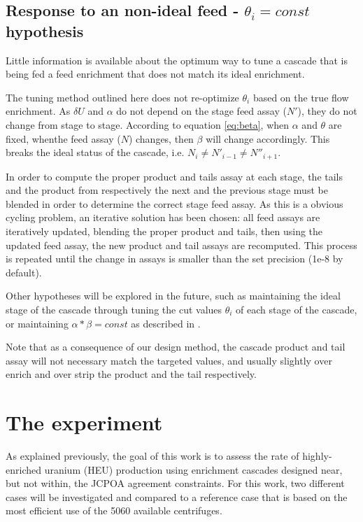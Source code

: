 \documentclass{anstrans}
\begin{document}
\subsection{Response to an non-ideal feed - $\theta_{i} = const$ hypothesis}

Little information is available about the optimum way to tune a cascade that is
being fed a feed enrichment that does not match its ideal enrichment.

The tuning method outlined here does not re-optimize $\theta_i$ based on the
true flow enrichment. As $\delta U$ and $\alpha$ do not depend on the stage feed
assay ($N'$), they do not change from stage to
stage. According to equation \eqref{eq:beta}, when $\alpha$ and $\theta$ are
fixed, whenthe feed assay ($N$) changes, then $\beta$ will change accordingly.
This breaks the ideal status of the cascade, i.e.  $N_{i} \neq N'_{i-1} \neq
N''_{i+1}$.

In order to compute the proper product and tails assay at each stage, the
tails and the product from respectively the next and the previous stage must be
blended in order to determine the correct stage feed assay. As this is a obvious
cycling problem, an iterative solution has been chosen: all feed assays are
iteratively updated, blending the proper product and tails, then using the
updated feed assay, the new product and tail assays are recomputed. This process
is repeated until the change in assays is smaller than the set precision (1e-8
by default).

Other hypotheses will be explored in the future, such as maintaining the ideal
stage of the cascade through tuning the cut values $\theta_{i}$ of each stage of
the cascade, or maintaining $\alpha*\beta = const$ as described in
\cite{walker.2017}.

Note that as a consequence of our design method, the cascade product and tail
assay will not necessary match the targeted values, and usually slightly over
enrich and over strip the product and the tail respectively.

\section{The experiment}

As explained previously, the goal of this work is to assess the rate of
highly-enriched uranium (HEU) production using enrichment cascades designed
near, but not within, the JCPOA agreement constraints. For this work, two different cases will
be investigated and compared to a reference case that is based on the most efficient use of the 5060 available centrifuges.
\end{document}
